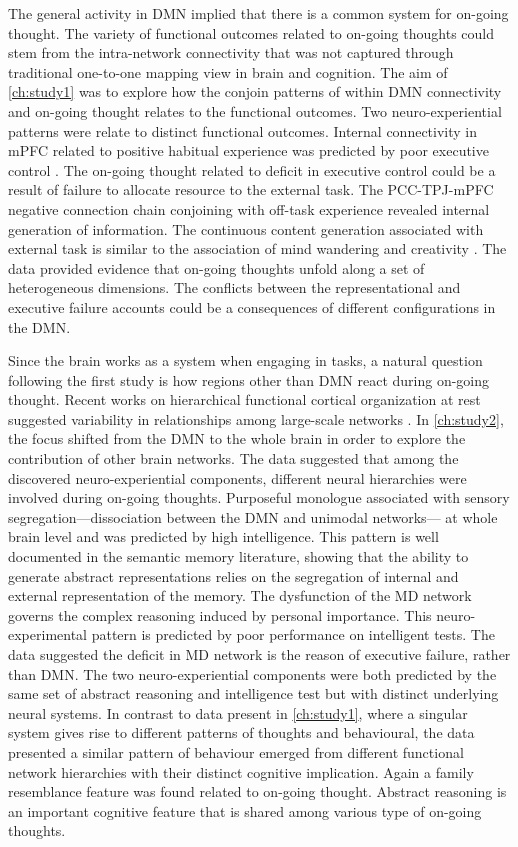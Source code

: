 The general activity in DMN implied that there is a common system for on-going thought. The variety of functional outcomes related to on-going thoughts could stem from the intra-network connectivity that was not captured through traditional one-to-one mapping view in brain and cognition. The aim of \cref{ch:study1} was to explore how the conjoin patterns of within DMN connectivity and on-going thought relates to the functional outcomes. Two neuro-experiential patterns were relate to distinct functional outcomes. Internal connectivity in mPFC related to positive habitual experience was predicted by poor executive control \cite{McVay2009}. The on-going thought related to deficit in executive control could be a result of failure to allocate resource to the external task. The PCC-TPJ-mPFC negative connection chain conjoining with off-task experience revealed internal generation of information. The continuous content generation associated with external task is similar to the association of mind wandering and creativity \cite{Baird2012}. The data provided evidence that on-going thoughts unfold along a set of heterogeneous dimensions. The conflicts between the representational and executive failure accounts could be a consequences of different configurations in the DMN. 

Since the brain works as a system when engaging in tasks, a natural question following the first study is how regions other than DMN react during on-going thought. Recent works on hierarchical functional cortical organization at rest suggested variability in relationships among large-scale networks \cite{Margulies2016}. In \cref{ch:study2}, the focus shifted from the DMN to the whole brain in order to explore the contribution of other brain networks. The data suggested that among the discovered neuro-experiential components, different neural hierarchies were involved during on-going thoughts. Purposeful monologue associated with sensory segregation---dissociation between the DMN and unimodal networks--- at whole brain level and was predicted by high intelligence. This pattern is well documented in the semantic memory literature, showing that the ability to generate abstract representations relies on the segregation of internal and external representation of the memory\cite{Murphy2018}. The dysfunction of the MD network \cite{Duncan2010} governs the complex reasoning induced by personal importance. This neuro-experimental pattern is predicted by poor performance on intelligent tests. The data suggested the deficit in MD network is the reason of executive failure, rather than DMN. The two neuro-experiential components were both predicted by the same set of abstract reasoning and intelligence test but with distinct underlying neural systems. In contrast to data present in \cref{ch:study1}, where a singular system gives rise to different patterns of thoughts and behavioural, the data presented a similar pattern of behaviour emerged from different functional network hierarchies with their distinct cognitive implication. Again a family resemblance feature was found related to on-going thought. Abstract reasoning is an important cognitive feature that is shared among various type of on-going thoughts. 

